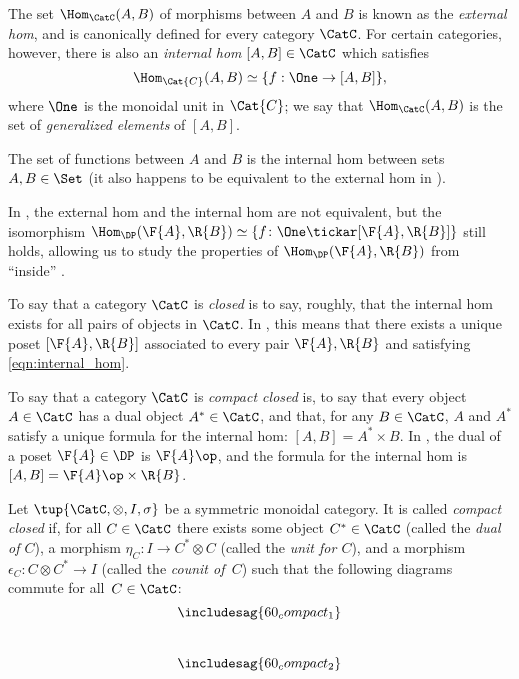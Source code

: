 \begin{ctdefinition}
The set $\Hom_\CatC(A,B)$ of morphisms between $A$ and $B$ is known as the \emph{external hom}, and is canonically defined for every category $\CatC$. For certain categories, however, there is also an \emph{internal hom} $[A,B] \in \CatC$ which satisfies
\begin{equation}
\label{eqn:internal_hom}
\Hom_\Cat{C}(A,B) \simeq \{ f : \One \to [A,B] \},
\end{equation}
where $\One$ is the monoidal unit in $\Cat{C}$; we say that $\Hom_\CatC(A,B)$ is the set of \emph{generalized elements} of $[A,B]$.
\end{ctdefinition}

\begin{example}
The set of functions between $A$ and $B$ is the internal hom between sets $A,B \in \Set$ (it also happens to be equivalent to the external hom in \Set).
\end{example}

In \DP, the external hom and the internal hom are not equivalent, but the isomorphism $\Hom_\DP(\F{A},\R{B}) \simeq \{ f \colon \One \tickar [\F{A},\R{B}] \}$ still holds, allowing us to study the properties of $\Hom_\DP(\F{A},\R{B})$ from ``inside'' \DP.

To say that a category $\CatC$ is \emph{closed} is to say, roughly, that the internal hom exists for all pairs of objects in $\CatC$. In \DP, this means that there exists a unique poset $[\F{A},\R{B}]$ associated to every pair $\F{A},\R{B}$ and satisfying \cref{eqn:internal_hom}.

To say that a category $\CatC$ is \emph{compact closed} is, to say that every object $A \in \CatC$ has a dual object $A^* \in \CatC$, and that, for any $B \in \CatC$, $A$ and $A^*$ satisfy a unique formula for the internal hom: $[A,B] = A^* \times B$. In \DP, the dual of a poset $\F{A} \in \DP$ is $\F{A}\op$, and the formula for the internal hom is $[A,B]=\F{A}\op \times \R{B}$.

\begin{ctdefinition}
Let $\tup{\CatC,\otimes,I,\sigma}$ be a symmetric monoidal category. It is called \emph{compact closed} if, for all $C \in\CatC$ there exists some object $C^*\in\CatC$ (called the \emph{dual of $C$}), a morphism $\eta_C\colon I\to C^*\otimes C$ (called the \emph{unit for $C$}), and a morphism $\epsilon_C\colon C\otimes C^*\to I$ (called the \emph{counit of~$C$}) such that the following diagrams commute for all~$C\in \CatC$:
\begin{equation}\label{eqn:ccc}
\includesag{60_compact_1}
\end{equation}
~
\begin{equation}
    \includesag{60_compact_2}
\end{equation}
\end{ctdefinition}

